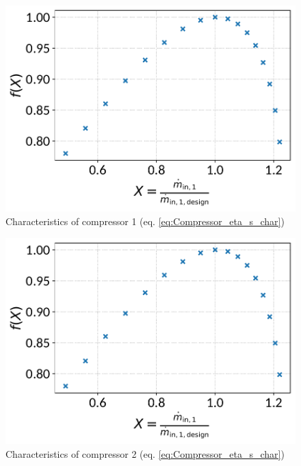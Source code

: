 \begin{minipage}{0.5\textwidth}
\begin{figure}[H]\begin{center}
\includegraphics[width=\textwidth]{figures/Compressor_CharLine_eta_s_char_compressor_1.pdf}
\caption{Characteristics of compressor 1 (eq. \ref{eq:Compressor_eta_s_char})}
\label{fig:CharLine_eta_s_char_compressor 1}
\end{center}\end{figure}

\end{minipage}
\begin{minipage}{0.5\textwidth}
\begin{figure}[H]\begin{center}
\includegraphics[width=\textwidth]{figures/Compressor_CharLine_eta_s_char_compressor_2.pdf}
\caption{Characteristics of compressor 2 (eq. \ref{eq:Compressor_eta_s_char})}
\label{fig:CharLine_eta_s_char_compressor 2}
\end{center}\end{figure}

\end{minipage}


